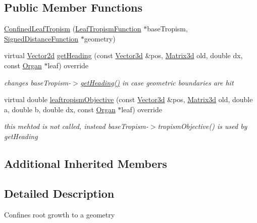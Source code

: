 \subsection*{Public Member Functions}
\begin{DoxyCompactItemize}
\item 
\hyperlink{classCPlantBox_1_1ConfinedLeafTropism_a4edff5fe35c9f489f4e86ac972c362d2}{Confined\+Leaf\+Tropism} (\hyperlink{classCPlantBox_1_1LeafTropismFunction}{Leaf\+Tropism\+Function} $\ast$base\+Tropism, \hyperlink{classCPlantBox_1_1SignedDistanceFunction}{Signed\+Distance\+Function} $\ast$geometry)
\item 
virtual \hyperlink{classCPlantBox_1_1Vector2d}{Vector2d} \hyperlink{classCPlantBox_1_1ConfinedLeafTropism_a0574aa544341937fc9df37a972cd0833}{get\+Heading} (const \hyperlink{classCPlantBox_1_1Vector3d}{Vector3d} \&pos, \hyperlink{classCPlantBox_1_1Matrix3d}{Matrix3d} old, double dx, const \hyperlink{classCPlantBox_1_1Organ}{Organ} $\ast$leaf) override
\begin{DoxyCompactList}\small\item\em changes base\+Tropism-\/$>$\hyperlink{classCPlantBox_1_1ConfinedLeafTropism_a0574aa544341937fc9df37a972cd0833}{get\+Heading()} in case geometric boundaries are hit \end{DoxyCompactList}\item 
\mbox{\label{classCPlantBox_1_1ConfinedLeafTropism_afaa130b76e027bd9c21fe1938ecf9067}} 
virtual double \hyperlink{classCPlantBox_1_1ConfinedLeafTropism_afaa130b76e027bd9c21fe1938ecf9067}{leaftropism\+Objective} (const \hyperlink{classCPlantBox_1_1Vector3d}{Vector3d} \&pos, \hyperlink{classCPlantBox_1_1Matrix3d}{Matrix3d} old, double a, double b, double dx, const \hyperlink{classCPlantBox_1_1Organ}{Organ} $\ast$leaf) override
\begin{DoxyCompactList}\small\item\em this mehtod is not called, instead base\+Tropism-\/$>$tropism\+Objective() is used by get\+Heading \end{DoxyCompactList}\end{DoxyCompactItemize}
\subsection*{Additional Inherited Members}


\subsection{Detailed Description}
Confines root growth to a geometry 

